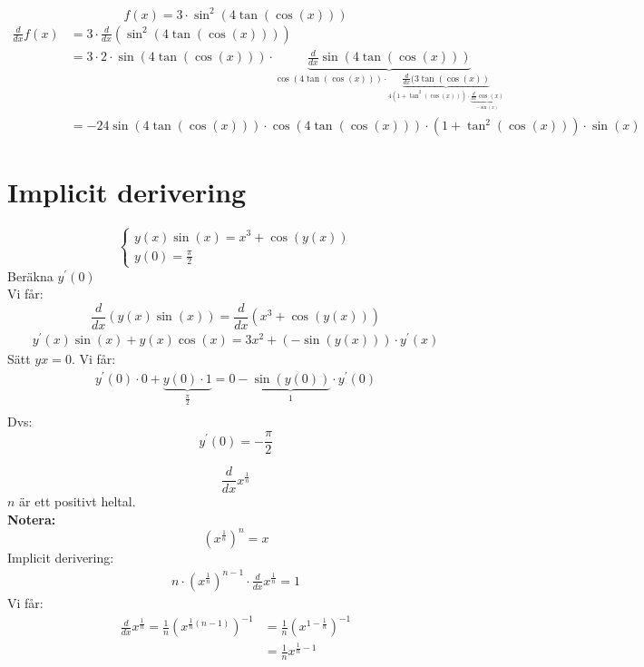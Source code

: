 \begin{Ex}
    \[
    f(x) = 3 \cdot \sin^2(4\tan(\cos(x)))
    \]
    \begin{align*}
    	\frac{d}{dx}f(x) &= 3 \cdot \frac{d}{dx}(\sin^2(4\tan(\cos(x)))) \\
    	&= 3 \cdot 2 \cdot \sin(4\tan(\cos(x))) \cdot \underbrace{\frac{d}{dx}\sin(4\tan(\cos(x)))}_{\cos(4\tan(\cos(x))) \cdot \underbrace{\frac{d}{dx}(3\tan(\cos(x))}_{4(1 + \tan^2(\cos(x))) \cdot \underbrace{\frac{d}{dx}\cos(x)}_{-\sin(x)}}} \\
    	&= -24 \sin(4\tan(\cos(x))) \cdot \cos(4\tan(\cos(x))) \cdot (1 + \tan^2(\cos(x))) \cdot \sin(x)
    \end{align*}
\end{Ex}
\section{Implicit derivering} %
\label{sec:implicit_derivering}
\begin{Ex}
    \[
    \begin{cases}
    	y(x)\sin(x) = x^3 + \cos(y(x))\\
    	y(0) = \frac{\pi}{2}
    \end{cases}
    \]
    Beräkna $y^\prime (0)$\\
    Vi får:
    \[
    \frac{d}{dx}(y(x)\sin(x)) = \frac{d}{dx}(x^3 + \cos(y(x)))
    \]
    \begin{align*}
    	y ^\prime(x)\sin(x) + y(x)\cos(x) = 3x^2 + (-\sin(y(x))) \cdot y ^\prime(x)
    \end{align*}
    Sätt $y x = 0$. Vi får:
    \begin{align*}
    	y ^\prime(0) \cdot 0 + \underbrace{y(0) \cdot 1}_{\frac{\pi}{2}} = 0 - \underbrace{\sin(y(0))}_{1} \cdot y ^\prime(0) \\
    \end{align*}
    Dvs: 
    \[
    y ^\prime(0) = - \frac{\pi}{2}
    \]
\end{Ex}
\begin{Ex}
    \[
    \frac{d}{dx}x^{\frac{1}{n}}
    \]
    $n$ är ett positivt heltal.\\
    \textbf{Notera: }
    \[
    (x^{\frac{1}{n}})^n = x
    \]
    Implicit derivering:
    \begin{align*}
    	n \cdot (x^{\frac{1}{n}})^{n-1} \cdot \frac{d}{dx}x^{\frac{1}{n}} = 1
    \end{align*}
    Vi får:
    \begin{align*}
    	\frac{d}{dx}x^{\frac{1}{n}} = \frac{1}{n}(x^{\frac{1}{n}(n -1)})^{-1} &= \frac{1}{n}(x^{1- \frac{1}{n}})^{-1} \\
    	&= \frac{1}{n}x^{\frac{1}{n}-1}
    \end{align*}
\end{Ex}

